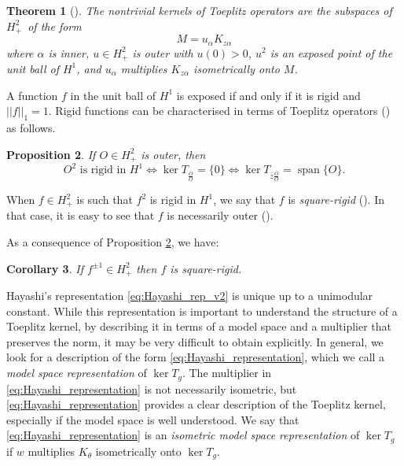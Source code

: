 \documentclass[12pt]{elsarticle}
\numberwithin{equation}{section}
\theoremstyle{plain}
\newtheorem{thm}{Theorem}[section]
\newtheorem{prop}[thm]{Proposition}
\newtheorem{cor}[thm]{Corollary}
\newcommand{\Hp}{\ensuremath{H^2_+}}
\newcommand{\ol}[1]{\ensuremath{\overline{#1}}}
\newcommand{\spn}{\ensuremath{\operatorname{span}}}
\begin{document}
\begin{thm}[{\cite[Theorem 5]{Ha90}}]
\label{thm:Hayashi_rep}
The nontrivial kernels of Toeplitz operators are the subspaces of \Hp\ of the form
\begin{equation}
\label{eq:Hayashi_rep_v2}
M = u_\alpha K_{z \alpha}
\end{equation}
where $\alpha$ is inner, $u\in\Hp$ is outer with $u(0)>0$, $u^2$ is an exposed point of the unit ball of $H^1$, and $u_\alpha$ multiplies $K_{z \alpha}$ isometrically onto $M$.
\end{thm}


A function $f$ in the unit ball of $H^1$ is exposed if and only if it is rigid and $||f||_1 = 1$.
Rigid functions can be characterised in terms of Toeplitz operators (\cite[Proposition 1]{Sa94}) as follows.


\begin{prop}
\label{prop:square.rigid}
If $O\in\Hp$ is outer, then 
\[
O^2 \text{ is rigid in } H^1 \iff \ker T_\frac{\ol O}{O} = \{ 0 \} \iff \ker T_{\ol z \frac{\ol O}{O}} = \spn \{ O \}.
\]
\end{prop}


When $f \in \Hp$ is such that $f^2$ is rigid in $H^1$, we say that $f$ is {\em square-rigid} (\cite{CP16_finite}).
In that case, it is easy to see that $f$ is necessarily outer (\cite{Sa94}).

As a consequence of Proposition \ref{prop:square.rigid}, we have:


\begin{cor}
If $f^{\pm 1} \in \Hp$ then $f$ is square-rigid.
\end{cor}


Hayashi's representation \eqref{eq:Hayashi_rep_v2} is unique up to a unimodular constant.
While this representation is important to understand the structure of a Toeplitz kernel, by describing it in terms of a model space and a multiplier that preserves the norm, it may be very difficult to obtain explicitly.
In general, we look for a description of the form \eqref{eq:Hayashi_representation}, which we call a {\em model space representation} of $\ker T_g$. 
The multiplier in \eqref{eq:Hayashi_representation} is not necessarily isometric, but \eqref{eq:Hayashi_representation} provides a clear description of the Toeplitz kernel, especially if the model space is well understood.
We say that \eqref{eq:Hayashi_representation} is an {\em isometric model space representation} of $\ker T_g$ if $w$ multiplies $K_\theta$ isometrically onto $\ker T_g$.
\end{document}
